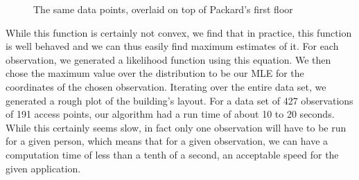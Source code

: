 \begin{figure}
\caption{The same data points, overlaid on top of Packard's first floor}
\end{figure}

While this function is certainly not convex, we find that in practice, this 
function is well behaved and we can thus easily find maximum estimates of it.
For each observation, we generated a likelihood function using this equation.
We then chose the maximum value over the
distribution to be our MLE for the coordinates of the chosen
observation. Iterating over the entire data set, we generated a rough
plot of the building's layout.
For a data set of 427 observations of 191 access points, our algorithm
had a run time of about 10 to 20 seconds. While this certainly seems slow,
in fact only one observation will have to be run for a given person, which 
means that for a given observation, we can have a computation time of less than a
tenth of a second, an acceptable speed for the given application.
